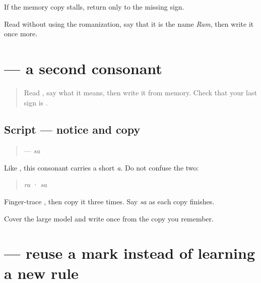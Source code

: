 If the memory copy stalls, return only to the missing sign.

\begin{tcolorbox}[breakable,colback=teal!4,colframe=teal!35!black,title={Before you move on}]
Read \textbf{} without using the romanization, say that it is the name \emph{Ram}, then write it once more.
\end{tcolorbox}
\section[\texorpdfstring{\mw{स} (sa)}{स (sa)}]{ — a second consonant}

\label{lesson:MW-W01-sa}



\begin{quote}
Read \textbf{}, say what it means, then write it from memory. Check that your last sign is \textbf{}.
\end{quote}

\subsection*{Script — notice and copy}

\begin{quote}
\textbf{} — \emph{sa}
\end{quote}

Like \textbf{}, this consonant carries a short \emph{a}. Do not confuse the two:

\begin{quote}
\textbf{} \emph{ra} · \textbf{} \emph{sa}
\end{quote}

Finger-trace \textbf{}, then copy it three times. Say \emph{sa} as each copy finishes.

\begin{tcolorbox}[breakable,colback=teal!4,colframe=teal!35!black,title={Before you move on}]
Cover the large model and write \textbf{} once from the copy you remember.
\end{tcolorbox}
\section[\texorpdfstring{\mw{सा} (sā)}{सा (sā)}]{ — reuse a mark instead of learning a new rule}

